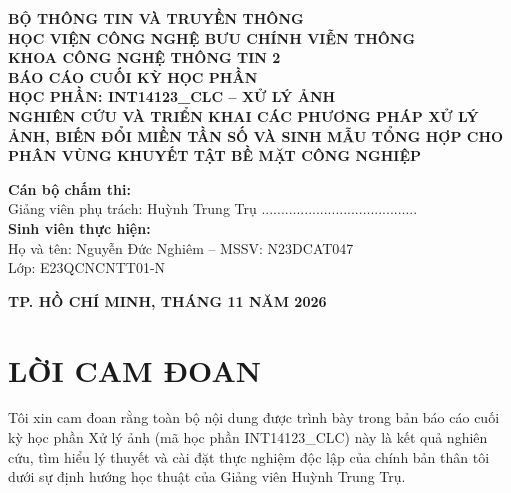 \documentclass[12pt,a4paper,oneside]{report}
\begin{document}
\newpage
\thispagestyle{empty}
\begin{center}
    \textbf{\large BỘ THÔNG TIN VÀ TRUYỀN THÔNG}\\[0.2cm]
    \textbf{\large HỌC VIỆN CÔNG NGHỆ BƯU CHÍNH VIỄN THÔNG}\\[0.2cm]
    \textbf{\large KHOA CÔNG NGHỆ THÔNG TIN 2}\\[2.0cm]

    \textbf{\Large BÁO CÁO CUỐI KỲ HỌC PHẦN}\\[0.3cm]
    \textbf{\large HỌC PHẦN: INT14123\_CLC -- XỬ LÝ ẢNH}\\[1.5cm]

    \textbf{\LARGE NGHIÊN CỨU VÀ TRIỂN KHAI CÁC PHƯƠNG PHÁP XỬ LÝ ẢNH, BIẾN ĐỔI MIỀN TẦN SỐ VÀ SINH MẪU TỔNG HỢP CHO PHÂN VÙNG KHUYẾT TẬT BỀ MẶT CÔNG NGHIỆP}\\[2.0cm]

    \begin{flushright}
    \begin{minipage}{0.65\textwidth}
        \textbf{Cán bộ chấm thi:}\\[0.1cm]
        Giảng viên phụ trách: Huỳnh Trung Trụ ........................................\\[0.8cm]
        \textbf{Sinh viên thực hiện:}\\[0.1cm]
        Họ và tên: Nguyễn Đức Nghiêm -- MSSV: N23DCAT047\\[0.1cm]
        Lớp: E23QCNCNTT01-N
    \end{minipage}
    \end{flushright}

    \vfill
    \textbf{\large TP. HỒ CHÍ MINH, THÁNG 11 NĂM 2026}
\end{center}

\newpage
\chapter*{LỜI CAM ĐOAN}

Tôi xin cam đoan rằng toàn bộ nội dung được trình bày trong bản báo cáo cuối kỳ học phần Xử lý ảnh (mã học phần INT14123\_CLC) này là kết quả nghiên cứu, tìm hiểu lý thuyết và cài đặt thực nghiệm độc lập của chính bản thân tôi dưới sự định hướng học thuật của Giảng viên Huỳnh Trung Trụ.
\end{document}
